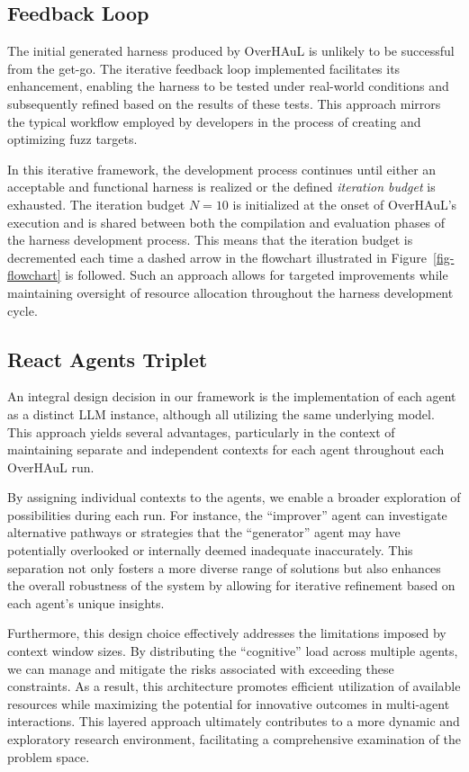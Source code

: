\documentclass[
  a4paper,
]{scrreprt}
\theoremstyle{definition}
\theoremstyle{remark}
\begin{document}
\subsection{Feedback Loop}\label{sec-loop}

The initial generated harness produced by OverHAuL is unlikely to be
successful from the get-go. The iterative feedback loop implemented
facilitates its enhancement, enabling the harness to be tested under
real-world conditions and subsequently refined based on the results of
these tests. This approach mirrors the typical workflow employed by
developers in the process of creating and optimizing fuzz targets.

In this iterative framework, the development process continues until
either an acceptable and functional harness is realized or the defined
\emph{iteration budget} is exhausted. The iteration budget \(N=10\) is
initialized at the onset of OverHAuL's execution and is shared between
both the compilation and evaluation phases of the harness development
process. This means that the iteration budget is decremented each time a
dashed arrow in the flowchart illustrated in Figure~\ref{fig-flowchart}
is followed. Such an approach allows for targeted improvements while
maintaining oversight of resource allocation throughout the harness
development cycle.

\subsection{React Agents Triplet}\label{react-agents-triplet}

An integral design decision in our framework is the implementation of
each agent as a distinct LLM instance, although all utilizing the same
underlying model. This approach yields several advantages, particularly
in the context of maintaining separate and independent contexts for each
agent throughout each OverHAuL run.

By assigning individual contexts to the agents, we enable a broader
exploration of possibilities during each run. For instance, the
``improver'' agent can investigate alternative pathways or strategies
that the ``generator'' agent may have potentially overlooked or
internally deemed inadequate inaccurately. This separation not only
fosters a more diverse range of solutions but also enhances the overall
robustness of the system by allowing for iterative refinement based on
each agent's unique insights.

Furthermore, this design choice effectively addresses the limitations
imposed by context window sizes. By distributing the ``cognitive'' load
across multiple agents, we can manage and mitigate the risks associated
with exceeding these constraints. As a result, this architecture
promotes efficient utilization of available resources while maximizing
the potential for innovative outcomes in multi-agent interactions. This
layered approach ultimately contributes to a more dynamic and
exploratory research environment, facilitating a comprehensive
examination of the problem space.
\end{document}
